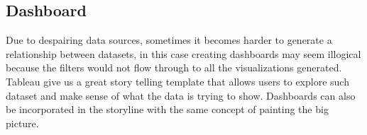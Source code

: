 \subsection{Dashboard} \label{viz_dashboard}
Due to despairing data sources, sometimes it becomes harder to
generate a relationship between datasets, in this case creating
dashboards may seem illogical because the filters would not flow
through to all the visualizations generated. Tableau give us a great
story telling template that allows users to explore such dataset and
make sense of what the data is trying to show. Dashboards can also be
incorporated in the storyline with the same concept of painting the
big picture.



